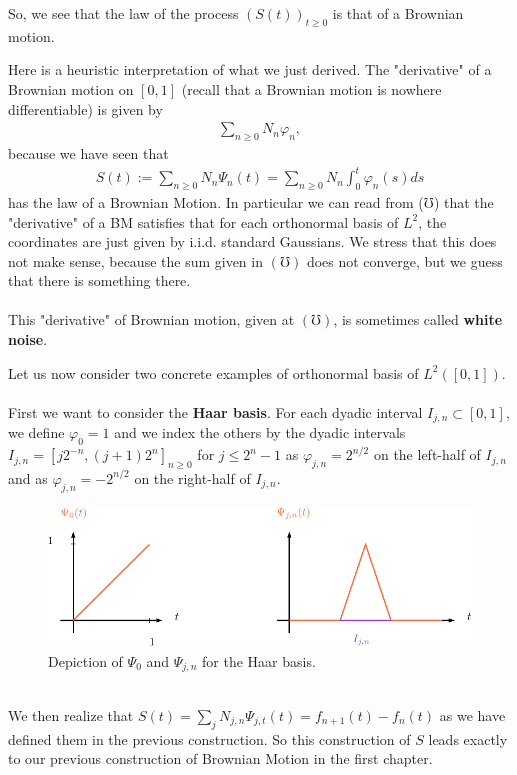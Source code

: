 \documentclass[../mainfile.tex]{subfiles}
\begin{document}
So, we see that the law of the process $(S(t))_{t \geq 0}$ is that of a Brownian motion. 
\newpage
\begin{rem} Here is a heuristic interpretation of what we just derived. The "derivative" of a Brownian motion on $[0,1]$ (recall that a Brownian motion is nowhere differentiable) is given by
\begin{align*}
\sum_{n \geq 0} N_n \varphi_n, \tag{$\mho$}
\end{align*}
because we have seen that 
\begin{align*}
S(t):= \sum_{n \geq 0 } N_n \Psi_n(t) = \sum_{n \geq 0} N_n \int_0^t \varphi_n(s)ds
\end{align*}
has the law of a Brownian Motion. In particular we can read from ($\mho$) that the "derivative" of a BM satisfies that for each orthonormal basis of $L^2$, the coordinates are just given by i.i.d. standard Gaussians. We stress that this does not make sense, because the sum given in $(\mho)$ does not converge, but we guess that there is something there. \\
\\
This "derivative" of Brownian motion, given at $(\mho)$, is sometimes called \textbf{white noise}.
\end{rem}
Let us now consider two concrete examples of orthonormal basis of $L^2([0,1])$. \\\\
First we want to consider the \textbf{Haar basis}. For each dyadic interval $I_{j,n} \subset [0,1]$, we define $\varphi_0=1$ and we index the others by the dyadic intervals $I_{j,n}=[j2^{-n},(j+1)2^n]_{n \geq 0}$ for $j \leq 2^n-1$ as $\varphi_{j,n}=2^{n/2}$ on the left-half of $I_{j,n}$ and as $\varphi_{j,n}=-2^{n/2}$ on the right-half of $I_{j,n}$. 
\begin{figure}[hbtp]
\centering
\includegraphics[scale=.9]{figure3.pdf}
\caption{Depiction of $\Psi_0$ and $\Psi_{j,n}$ for the Haar basis.}
\end{figure}
\\
We then realize that $S(t)=\sum_j N_{j,n}\Psi_{j,t}(t)= f_{n+1}(t)-f_n(t)$ as we have defined them in the previous construction. So this construction of $S$ leads exactly to our previous construction of Brownian Motion in the first chapter. 
\newpage
\end{document}
